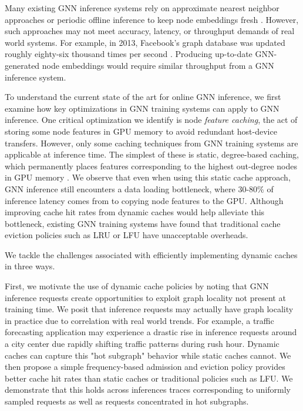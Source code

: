 Many existing GNN inference systems rely on approximate nearest neighbor approaches or periodic offline inference to keep node embeddings fresh \cite{Recsys_PinSAGE_2018} \cite{Recsys_Survey_2022}. However, such approaches may not meet accuracy, latency, or throughput demands of real world systems. For example, in 2013, Facebook's graph database was updated roughly eighty-six thousand times per second \cite{Graph_Survey_2020}. Producing up-to-date GNN-generated node embeddings would require similar throughput from a GNN inference system.

To understand the current state of the art for online GNN inference, we first examine how key optimizations in GNN training systems can apply to GNN inference. One critical optimization we identify is node \textit{feature caching}, the act of storing some node features in GPU memory to avoid redundant host-device transfers.
However, only some caching techniques from GNN training systems are applicable at inference time.
The simplest of these is static, degree-based caching, which permanently places features corresponding to the highest out-degree nodes in GPU memory \cite{PaGraph_2020}.
We observe that even when using this static cache approach, GNN inference still encounters a data loading bottleneck, where 30-80\% of inference latency comes from to copying node features to the GPU.
Although improving cache hit rates from dynamic caches would help alleviate this bottleneck, existing GNN training systems have found that traditional cache eviction policies such as LRU or LFU have unacceptable overheads.

We tackle the challenges associated with efficiently implementing dynamic caches in three ways.

First, we motivate the use of dynamic cache policies by noting that GNN inference requests create opportunities to exploit graph locality not present at training time. We posit that inference requests may actually have graph locality in practice due to correlation with real world trends. For example, a traffic forecasting application may experience a drastic rise in inference requests around a city center due rapidly shifting traffic patterns during rush hour. Dynamic caches can capture this "hot subgraph" behavior while static caches cannot. We then propose a simple frequency-based admission and eviction policy provides better cache hit rates than static caches or traditional policies such as LFU. We demonstrate that this holds across inferences traces corresponding to uniformly sampled requests as well as requests concentrated in hot subgraphs.

